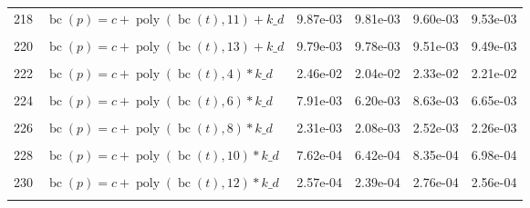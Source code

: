 \documentclass[12pt,a4paper]{article}
\DeclareMathOperator{\bc}{bc}
\DeclareMathOperator{\poly}{poly}
\begin{document}
\begin{longtable}[t]{ll>{\raggedleft\arraybackslash}p{2cm}>{\raggedleft\arraybackslash}p{2cm}>{\raggedleft\arraybackslash}p{2cm}>{\raggedleft\arraybackslash}p{2cm}}
218 & $\bc(p) = c + \poly\left( \bc(t), 11 \right) + k\_d$ & 9.87e-03 & 9.81e-03 & 9.60e-03 & 9.53e-03\\
\cellcolor{gray!6}{219} & \cellcolor{gray!6}{$\bc(p) = c + \poly\left( \bc(t), 12 \right) + k\_d$} & \cellcolor{gray!6}{9.80e-03} & \cellcolor{gray!6}{9.78e-03} & \cellcolor{gray!6}{9.51e-03} & \cellcolor{gray!6}{9.49e-03}\\
220 & $\bc(p) = c + \poly\left( \bc(t), 13 \right) + k\_d$ & 9.79e-03 & 9.78e-03 & 9.51e-03 & 9.49e-03\\
\cellcolor{gray!6}{221} & \cellcolor{gray!6}{$\bc(p) = c + \poly\left( \bc(t), 3 \right) * k\_d$} & \cellcolor{gray!6}{3.59e-02} & \cellcolor{gray!6}{1.77e-02} & \cellcolor{gray!6}{2.00e-02} & \cellcolor{gray!6}{1.89e-02}\\
222 & $\bc(p) = c + \poly\left( \bc(t), 4 \right) * k\_d$ & 2.46e-02 & 2.04e-02 & 2.33e-02 & 2.21e-02\\
\cellcolor{gray!6}{223} & \cellcolor{gray!6}{$\bc(p) = c + \poly\left( \bc(t), 5 \right) * k\_d$} & \cellcolor{gray!6}{8.33e-03} & \cellcolor{gray!6}{8.31e-03} & \cellcolor{gray!6}{8.17e-03} & \cellcolor{gray!6}{8.15e-03}\\
224 & $\bc(p) = c + \poly\left( \bc(t), 6 \right) * k\_d$ & 7.91e-03 & 6.20e-03 & 8.63e-03 & 6.65e-03\\
\cellcolor{gray!6}{225} & \cellcolor{gray!6}{$\bc(p) = c + \poly\left( \bc(t), 7 \right) * k\_d$} & \cellcolor{gray!6}{3.56e-03} & \cellcolor{gray!6}{2.94e-03} & \cellcolor{gray!6}{3.19e-03} & \cellcolor{gray!6}{2.96e-03}\\
226 & $\bc(p) = c + \poly\left( \bc(t), 8 \right) * k\_d$ & 2.31e-03 & 2.08e-03 & 2.52e-03 & 2.26e-03\\
\cellcolor{gray!6}{227} & \cellcolor{gray!6}{$\bc(p) = c + \poly\left( \bc(t), 9 \right) * k\_d$} & \cellcolor{gray!6}{1.81e-03} & \cellcolor{gray!6}{1.68e-03} & \cellcolor{gray!6}{1.95e-03} & \cellcolor{gray!6}{1.79e-03}\\
228 & $\bc(p) = c + \poly\left( \bc(t), 10 \right) * k\_d$ & 7.62e-04 & 6.42e-04 & 8.35e-04 & 6.98e-04\\
\cellcolor{gray!6}{229} & \cellcolor{gray!6}{$\bc(p) = c + \poly\left( \bc(t), 11 \right) * k\_d$} & \cellcolor{gray!6}{5.27e-04} & \cellcolor{gray!6}{4.81e-04} & \cellcolor{gray!6}{5.60e-04} & \cellcolor{gray!6}{5.06e-04}\\
230 & $\bc(p) = c + \poly\left( \bc(t), 12 \right) * k\_d$ & 2.57e-04 & 2.39e-04 & 2.76e-04 & 2.56e-04\\
\cellcolor{gray!6}{231} & \cellcolor{gray!6}{$\bc(p) = c + \poly\left( \bc(t), 13 \right) * k\_d$} & \cellcolor{gray!6}{1.92e-04} & \cellcolor{gray!6}{1.86e-04} & \cellcolor{gray!6}{2.02e-04} & \cellcolor{gray!6}{1.95e-04}\\*
\end{longtable}
\endgroup{}
\end{document}
